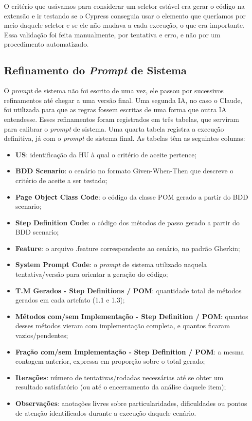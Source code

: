 O critério que usávamos para considerar um seletor estável era gerar o código na extensão e ir testando se o Cypress conseguia usar o elemento que queríamos por meio daquele seletor e se ele não mudava a cada execução, o que era importante. Essa validação foi feita manualmente, por tentativa e erro, e não por um procedimento automatizado.

\subsection{Refinamento do \textit{Prompt} de Sistema}
\label{sec:refinamento-system-prompt}

O \textit{prompt} de sistema não foi escrito de uma vez, ele passou por sucessivos refinamentos até chegar a uma versão final. Uma segunda IA, no caso o Claude, foi utilizada para que as regras fossem escritas de uma forma que outra IA entendesse. Esses refinamentos foram registrados em três tabelas, que serviram para calibrar o \textit{prompt} de sistema. Uma quarta tabela registra a execução definitiva, já com o \textit{prompt} de sistema final. As tabelas têm as seguintes colunas:

\begin{itemize}
    \item \textbf{US}: identificação da HU à qual o critério de aceite pertence;
    \item \textbf{BDD Scenario}: o cenário no formato Given-When-Then que descreve o critério de aceite a ser testado;
    \item \textbf{Page Object Class Code}: o código da classe POM gerado a partir do BDD scenario;
    \item \textbf{Step Definition Code}: o código dos métodos de passo gerado a partir do BDD scenario;
    \item \textbf{Feature}: o arquivo .feature correspondente ao cenário, no padrão Gherkin;
    \item \textbf{System Prompt Code}: o \textit{prompt} de sistema utilizado naquela tentativa/versão para orientar a geração do código;
    \item \textbf{T.M Gerados - Step Definitions / POM}: quantidade total de métodos gerados em cada artefato (1.1 e 1.3);
    \item \textbf{Métodos com/sem Implementação - Step Definition / POM}: quantos desses métodos vieram com implementação completa, e quantos ficaram vazios/pendentes;
    \item \textbf{Fração com/sem Implementação - Step Definition / POM}: a mesma contagem anterior, expressa em proporção sobre o total gerado;
    \item \textbf{Iterações}: número de tentativas/rodadas necessárias até se obter um resultado satisfatório (ou até o encerramento da análise daquele item);
    \item \textbf{Observações}: anotações livres sobre particularidades, dificuldades ou pontos de atenção identificados durante a execução daquele cenário.
\end{itemize}

